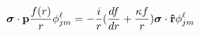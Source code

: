 \begin{equation}
{\mbox{\boldmath $\sigma$}}\cdot{\bf p}{f(r)\over r}\phi^{\ell}_{jm}=-
{i\over r}({df\over dr}+{\kappa f\over r}){\mbox{\boldmath $\sigma$}}
\cdot{\bf{\hat r}}\phi^{\ell}_{jm}
\end{equation}

